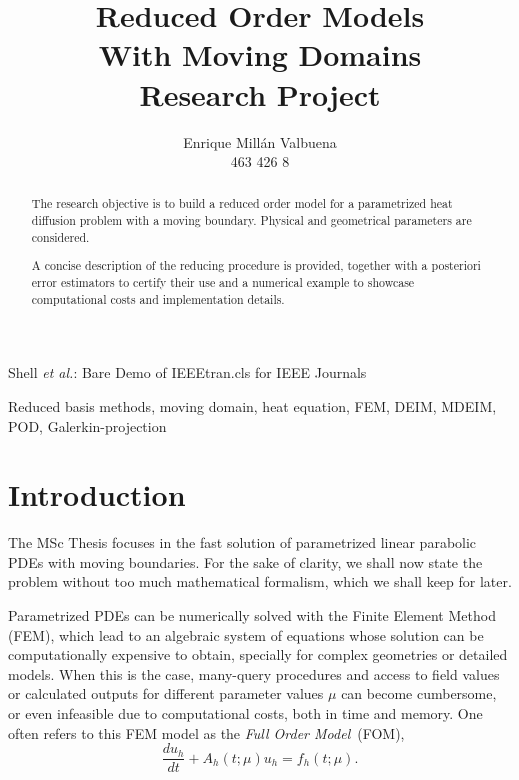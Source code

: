 \documentclass[a4paper, technote, compsoc]{IEEEtran}
\begin{document}
\title{Reduced Order Models \\ With Moving Domains \\ \normalsize{Research Project}}

\author{Enrique Millán Valbuena \\ \normalsize{463 426 8}}%
        
{Shell \MakeLowercase{\textit{et al.}}: Bare Demo of IEEEtran.cls for IEEE Journals}

\maketitle

\begin{abstract}
   The research objective is to build a reduced order model for a parametrized heat diffusion problem with a moving boundary. 
   Physical and geometrical parameters are considered.

   A concise description of the reducing procedure is provided, together with a posteriori error estimators to certify their use and a numerical example to showcase computational costs and implementation details. 
\end{abstract}

\begin{IEEEkeywords}
Reduced basis methods, moving domain, heat equation, FEM, DEIM, MDEIM, POD, Galerkin-projection
\end{IEEEkeywords}

\section{Introduction}
The MSc Thesis focuses in the fast solution of parametrized linear parabolic PDEs with moving boundaries.
For the sake of clarity, we shall now state the problem without too much mathematical formalism, which we shall keep for later.

Parametrized PDEs can be numerically solved with the Finite Element Method (FEM), which lead to an algebraic system of equations whose solution can be computationally expensive to obtain, specially for complex geometries or detailed models.
When this is the case, many-query procedures and access to field values or calculated outputs for different parameter values $\mu$ can become cumbersome, or even infeasible due to computational costs, both in time and memory.
One often refers to this FEM model as the \textit{Full Order Model}~(FOM),
\begin{equation*}
   \frac{du_h}{dt} + A_h\left(t;\mu\right) u_h = f_h\left(t;\mu\right).
\end{equation*}
\end{document}
